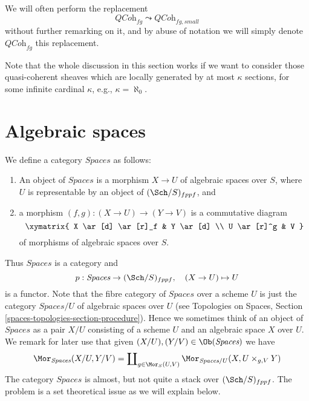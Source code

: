 \noindent
We will often perform the replacement
$$
\textit{QCoh}_{fg} \leadsto \textit{QCoh}_{fg, small}
$$
without further remarking on it, and by abuse of notation we will
simply denote $\textit{QCoh}_{fg}$ this replacement.

\begin{remark}
\label{remark-higher-rank}
Note that the whole discussion in this section works
if we want to consider those
quasi-coherent sheaves which are locally generated by at most $\kappa$
sections, for some infinite cardinal $\kappa$, e.g., $\kappa = \aleph_0$.
\end{remark}




\section{Algebraic spaces}
\label{section-stack-of-spaces}

\noindent
We define a category $\textit{Spaces}$ as follows:
\begin{enumerate}
\item An object of $\textit{Spaces}$ is a morphism $X \to U$
of algebraic spaces over $S$, where $U$ is representable by an object of
$(\Sch/S)_{fppf}$, and
\item a morphism $(f, g) : (X \to U) \to (Y \to V)$
is a commutative diagram
$$
\xymatrix{
X \ar[d] \ar[r]_f & Y \ar[d] \\
U \ar[r]^g & V
}
$$
of morphisms of algebraic spaces over $S$.
\end{enumerate}
Thus $\textit{Spaces}$ is a category and
$$
p : \textit{Spaces} \to (\Sch/S)_{fppf},
\quad
(X \to U) \mapsto U
$$
is a functor. Note that the fibre category of $\textit{Spaces}$ over
a scheme $U$ is just the category $\textit{Spaces}/U$ of
algebraic spaces over $U$ (see
Topologies on Spaces, Section \ref{spaces-topologies-section-procedure}).
Hence we sometimes think of an object of $\textit{Spaces}$ as a
pair $X/U$ consisting of a scheme $U$ and an algebraic space $X$ over $U$.
We remark for later use that given
$(X/U), (Y/V) \in \Ob(\textit{Spaces})$
we have
\begin{equation}
\label{equation-morphisms-spaces}
\Mor_{\textit{Spaces}}(X/U, Y/V)
=
\coprod\nolimits_{g \in \Mor_S(U, V)}
\Mor_{\textit{Spaces}/U}(X, U \times_{g, V} Y)
\end{equation}
The category $\textit{Spaces}$ is almost, but not quite a stack
over $(\Sch/S)_{fppf}$. The problem is a set theoretical
issue as we will explain below.

